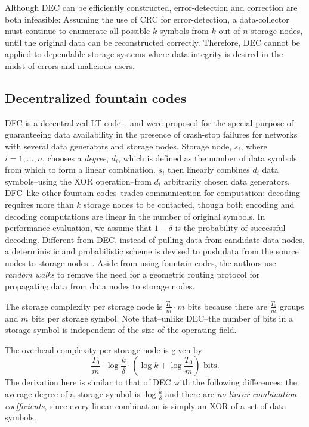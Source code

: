 \documentclass[10pt,journal,letterpaper,compsoc]{IEEEtran}
\newcommand{\0}{{\bf 0}}
\begin{document}
Although DEC can
be efficiently constructed, error-detection and correction are both infeasible: Assuming the use of CRC for error-detection, a data-collector must continue to enumerate all possible $k$ symbols from $k$ out of $n$ storage nodes, until the original data can be reconstructed correctly. Therefore, DEC cannot be applied to dependable storage systems where data integrity is desired in the midst of errors and malicious users.

\subsection{Decentralized fountain codes}
DFC is a decentralized LT code~\cite{luby2002lt}, and were proposed for the special purpose of guaranteeing data availability in the presence of crash-stop failures for networks with several data generators and storage nodes. Storage node, $s_i$, where $i=1,...,n$, chooses a \emph{degree}, $d_i$, which is defined as the number of data symbols from which to form a linear combination. $s_i$ then linearly combines $d_i$ data symbols--using the XOR operation--from $d_i$ arbitrarily chosen
data generators. DFC--like other fountain codes--trades communication for computation: decoding requires more than $k$ storage nodes to be contacted, though both encoding and decoding computations are linear in the number of original symbols. In performance evaluation, we assume that $1-\delta$ is the probability of successful decoding. 
Different from DEC, instead of pulling data from candidate data  nodes, a deterministic and probabilistic scheme is devised to push data from the
source nodes to storage nodes~\cite{lin2007dpl}. Aside from using fountain codes, the authors use \emph{random walks} to remove the need for a geometric routing protocol for propagating data from data  nodes to storage nodes.

The storage complexity per storage node is
$\frac{T_0}{m}\cdot m$ bits because there are $\frac{T_0}{m}$ groups and $m$ bits per storage symbol. Note that--unlike DEC--the number of bits in a storage symbol is independent of the size of the operating field.

The overhead complexity per storage node is given by $$\frac{T_0}{m}\cdot\log\frac{k}{\delta}\cdot(\log k + \log\frac{T_0}{m})\text{ bits.}$$ The derivation here is similar to that of DEC with the following differences: the average degree of a storage symbol is $\log\frac{k}{\delta}$ and there are \emph{no linear combination coefficients}, since every linear combination is simply an XOR of a set of data symbols. 
\end{document}
